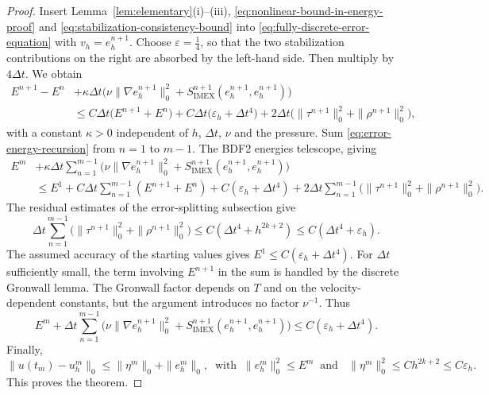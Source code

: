 \documentclass[11pt]{article}
\theoremstyle{remark}\newtheorem{remark}{Remark}
\newcommand{\Simex}{S_{\mathrm{IMEX}}}
\newcommand{\eps}{\varepsilon}
\theoremstyle{plain}
\begin{document}
\begin{proof}
Insert Lemma~\ref{lem:elementary}(i)--(iii), \eqref{eq:nonlinear-bound-in-energy-proof} and \eqref{eq:stabilization-consistency-bound} into \eqref{eq:fully-discrete-error-equation} with $v_h=e_h^{n+1}$. 
Choose $\eps=\frac14$, so that the two stabilization contributions on the right are absorbed by the left-hand side. Then multiply by $4\Delta t$. We obtain
\begin{equation}\label{eq:error-energy-recursion}
\begin{aligned}
E^{n+1}-E^n&+\kappa\Delta t\big(\nu\|\nabla e_h^{n+1}\|_0^2+\Simex^{n+1}(e_h^{n+1},e_h^{n+1})\big)\\
&\le C\Delta t\big(E^{n+1}+E^n\big)+C\Delta t\big(\varepsilon_h+\Delta t^4\big)+2\Delta t\big(\|\tau^{n+1}\|_0^2+\|\rho^{n+1}\|_0^2\big),
\end{aligned}
\end{equation}
with a constant $\kappa>0$ independent of $h$, $\Delta t$, $\nu$ and the pressure. Sum \eqref{eq:error-energy-recursion} from $n=1$ to $m-1$. The BDF2 energies telescope, giving
\begin{equation}\label{eq:summed-error-energy}
\begin{aligned}
E^m&+\kappa\Delta t\sum_{n=1}^{m-1}\big(\nu\|\nabla e_h^{n+1}\|_0^2+\Simex^{n+1}(e_h^{n+1},e_h^{n+1})\big)\\
&\le E^1+C\Delta t\sum_{n=1}^{m-1}(E^{n+1}+E^n)+C(\varepsilon_h+\Delta t^4)
+2\Delta t\sum_{n=1}^{m-1}\big(\|\tau^{n+1}\|_0^2+\|\rho^{n+1}\|_0^2\big).
\end{aligned}
\end{equation}
The residual estimates of the error-splitting subsection give
\[
\Delta t\sum_{n=1}^{m-1}\big(\|\tau^{n+1}\|_0^2+\|\rho^{n+1}\|_0^2\big)\le C(\Delta t^4+h^{2k+2})\le C(\Delta t^4+\varepsilon_h).
\]
The assumed accuracy of the starting values gives $E^1\le C(\varepsilon_h+\Delta t^4)$. For $\Delta t$ sufficiently small, the term involving $E^{n+1}$ in the sum is handled by the discrete Gronwall lemma. The Gronwall factor depends on $T$ and on the velocity-dependent constants, but the argument introduces no factor $\nu^{-1}$. Thus
\begin{equation}\label{eq:velocity-error-final}
E^m+\Delta t\sum_{n=1}^{m-1}\big(\nu\|\nabla e_h^{n+1}\|_0^2+\Simex^{n+1}(e_h^{n+1},e_h^{n+1})\big)\le C(\varepsilon_h+\Delta t^4).
\end{equation}
Finally, 
\[
    \|u(t_m)-u_h^m\|_0\le\|\eta^m\|_0+\|e_h^m\|_0,\;\; 
\text{with}\;\;\|e_h^m\|_0^2\le E^m \;\;\text{and }\;\; \|\eta^m\|_0^2\le Ch^{2k+2}\le C\varepsilon_h.
\]
This proves the theorem.
\end{proof}
\end{document}
